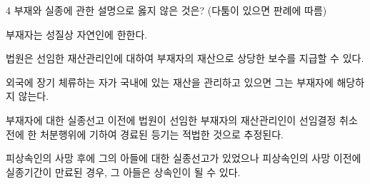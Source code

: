 \begin{question}{4}
부재와 실종에 관한 설명으로 옳지 않은 것은? (다툼이 있으면 판례에 따름)
\begin{choices}
  \item 부재자는 성질상 자연인에 한한다.
  \item 법원은 선임한 재산관리인에 대하여 부재자의 재산으로 상당한 보수를 지급할 수 있다.
  \item 외국에 장기 체류하는 자가 국내에 있는 재산을 관리하고 있으면 그는 부재자에 해당하지 않는다.
  \item 부재자에 대한 실종선고 이전에 법원이 선임한 부재자의 재산관리인이 선임결정 취소 전에 한 처분행위에 기하여 경료된 등기는 적법한 것으로 추정된다.
  \item 피상속인의 사망 후에 그의 아들에 대한 실종선고가 있었으나 피상속인의 사망 이전에 실종기간이 만료된 경우, 그 아들은 상속인이 될 수 있다.
\end{choices}
\end{question}
